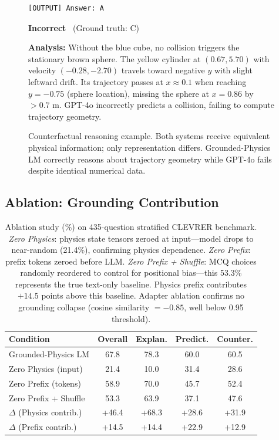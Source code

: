\documentclass[conference]{IEEEtran}
\theoremstyle{plain}
\theoremstyle{definition}
\theoremstyle{remark}
\begin{document}
\begin{figure}[t]
\begin{minipage}[t]{0.48\textwidth}
\begin{verbatim}
[OUTPUT] Answer: A
\end{verbatim}
\textbf{Incorrect} \texttimes\ (Ground truth: C)
\end{minipage}

\vspace{0.5em}
\noindent\textbf{Analysis:} Without the blue cube, no collision triggers the stationary brown sphere. The yellow cylinder at $(0.67, 5.70)$ with velocity $(-0.28, -2.70)$ travels toward negative $y$ with slight leftward drift. Its trajectory passes at $x \approx 0.1$ when reaching $y=-0.75$ (sphere location), missing the sphere at $x=0.86$ by $>0.7$ m. GPT-4o incorrectly predicts a collision, failing to compute trajectory geometry.

\caption{Counterfactual reasoning example. Both systems receive equivalent physical information; only representation differs. Grounded-Physics LM correctly reasons about trajectory geometry while GPT-4o fails despite identical numerical data.}
\label{fig:example_prompt}
\end{figure}

\subsection{Ablation: Grounding Contribution}
\label{sec:ablation}

\begin{table}[t]
\centering
\footnotesize
\begin{tabular*}{\columnwidth}{@{\extracolsep{\fill}}lcccc@{}}
\toprule
\textbf{Condition} & \textbf{Overall} & \textbf{Explan.} & \textbf{Predict.} & \textbf{Counter.} \\
\midrule
Grounded-Physics LM & 67.8 & 78.3 & 60.0 & 60.5 \\
Zero Physics (input) & 21.4 & 10.0 & 31.4 & 28.6 \\
Zero Prefix (tokens) & 58.9 & 70.0 & 45.7 & 52.4 \\
Zero Prefix + Shuffle & 53.3 & 63.9 & 37.1 & 47.6 \\
\midrule
$\Delta$ (Physics contrib.) & +46.4 & +68.3 & +28.6 & +31.9 \\
$\Delta$ (Prefix contrib.) & +14.5 & +14.4 & +22.9 & +12.9 \\
\bottomrule
\end{tabular*}
\caption{Ablation study (\%) on 435-question stratified CLEVRER benchmark. \emph{Zero Physics}: physics state tensors zeroed at input---model drops to near-random (21.4\%), confirming physics dependence. \emph{Zero Prefix}: prefix tokens zeroed before LLM. \emph{Zero Prefix + Shuffle}: MCQ choices randomly reordered to control for positional bias---this 53.3\% represents the true text-only baseline. Physics prefix contributes $+14.5$ points above this baseline. Adapter ablation confirms no grounding collapse (cosine similarity $=-0.85$, well below 0.95 threshold).}
\label{tab:ablation}
\end{table}
\end{document}
